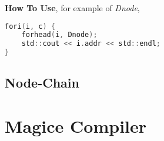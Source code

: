 \textbf{How To Use}, for example of \textit{Dnode},

\lstset{style=GlobalC}
\begin{lstlisting}[language=C]
fori(i, c) {
	forhead(i, Dnode);
	std::cout << i.addr << std::endl;
}
\end{lstlisting}

\subsection{Node-Chain}


\section{Magice Compiler}


